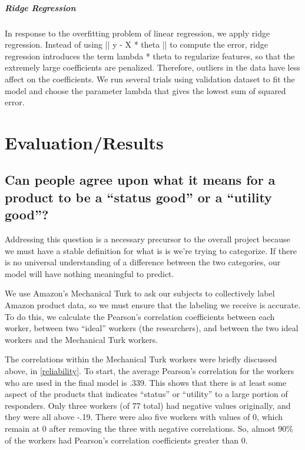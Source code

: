 \documentclass[dvips,12pt]{article}
\begin{document}
\subparagraph{Ridge Regression}
In response to the overfitting problem of linear regression, we apply ridge regression. Instead of using || y - X * theta || to compute the error, ridge regression introduces the term lambda * theta to regularize features, so that the extremely large coefficients are penalized. Therefore, outliers in the data have less affect on the coefficients. We run several trials using validation dataset to fit the model and choose the parameter lambda that gives the lowest sum of squared error. 

\section{Evaluation/Results}

\subsection{Can people agree upon what it means for a product to be a “status good” or a “utility good”?}
Addressing this question is a necessary precursor to the overall project because we must have a stable definition for what is is we’re trying to categorize. If there is no universal understanding of a difference between the two categories, our model will have nothing meaningful to predict. 

We use Amazon’s Mechanical Turk to ask our subjects to collectively label Amazon product data, so we must ensure that the labeling we receive is accurate. To do this, we calculate the Pearson’s correlation coefficients between each worker, between two “ideal” workers (the researchers), and between the two ideal workers and the Mechanical Turk workers. 

The correlations within the Mechanical Turk workers were briefly discussed above, in \ref{reliability}. To start, the average Pearson’s correlation for the workers who are used in the final model is .339. This shows that there is at least some aspect of the products that indicates “status” or “utility” to a large portion of responders. Only three workers (of 77 total) had negative values originally, and they were all above -.19. There were also five workers with values of 0, which remain at 0 after removing the three with negative correlations. So, almost 90\% of the workers had Pearson’s correlation coefficients greater than 0. 
\end{document}
